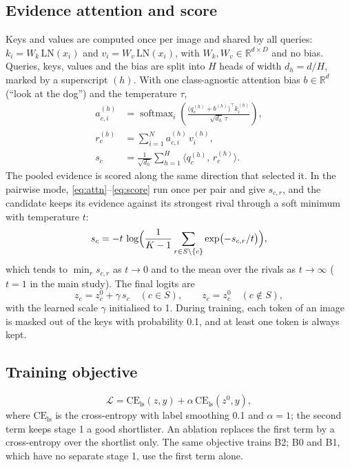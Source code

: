 \documentclass[11pt,a4paper]{article}
\theoremstyle{plain}
\newcommand{\R}{\mathbb{R}}
\newcommand{\LN}{\mathrm{LN}}
\newcommand{\CE}{\mathrm{CE}_{\mathrm{ls}}}
\begin{document}
\subsection{Evidence attention and score}\label{sec:attention}
Keys and values are computed once per image and shared by all queries: $k_i=W_k\,\LN(x_i)$ and $v_i=W_v\,\LN(x_i)$,
with $W_k,W_v\in\R^{d\times D}$ and no bias. Queries, keys, values and the bias are split into $H$ heads of width
$d_h=d/H$, marked by a superscript $(h)$. With one class-agnostic attention bias $b\in\R^d$ (``look at the dog'') and
the temperature $\tau$,
\begin{align}
a^{(h)}_{c,i}&=\operatorname{softmax}_i\!\left(\frac{\bigl(q^{(h)}_c+b^{(h)}\bigr)^{\!\top}k^{(h)}_i}{\sqrt{d_h}\,\tau}\right), \label{eq:attn}\\
r^{(h)}_c&=\sum_{i=1}^{N}a^{(h)}_{c,i}\,v^{(h)}_i, \label{eq:pool}\\
s_c&=\frac{1}{\sqrt{d_h}}\sum_{h=1}^{H}\bigl\langle q^{(h)}_c,\,r^{(h)}_c\bigr\rangle. \label{eq:score}
\end{align}
The pooled evidence is scored along the same direction that selected it. In the pairwise mode,
\eqref{eq:attn}--\eqref{eq:score} run once per pair and give $s_{c,r}$, and the candidate keeps its evidence against
its strongest rival through a soft minimum with temperature $t$:
\begin{equation}
s_c=-t\,\log\Bigl(\frac{1}{K-1}\sum_{r\in S\setminus\{c\}}\exp\bigl(-s_{c,r}/t\bigr)\Bigr),
\label{eq:softmin}
\end{equation}
which tends to $\min_r s_{c,r}$ as $t\to0$ and to the mean over the rivals as $t\to\infty$ ($t=1$ in the main
study). The final logits are
\begin{equation}
z_c=z^0_c+\gamma\,s_c\quad(c\in S),\qquad z_c=z^0_c\quad(c\notin S),
\label{eq:final}
\end{equation}
with the learned scale $\gamma$ initialised to 1. During training, each token of an image is masked out of the keys
with probability 0.1, and at least one token is always kept.

\subsection{Training objective}\label{sec:objective}
\begin{equation}
\mathcal{L}=\CE(z,y)+\alpha\,\CE(z^0,y),
\label{eq:loss}
\end{equation}
where $\CE$ is the cross-entropy with label smoothing 0.1 and $\alpha=1$; the second term keeps stage 1 a good
shortlister. An ablation replaces the first term by a cross-entropy over the shortlist only. The same objective
trains B2; B0 and B1, which have no separate stage 1, use the first term alone.
\end{document}
